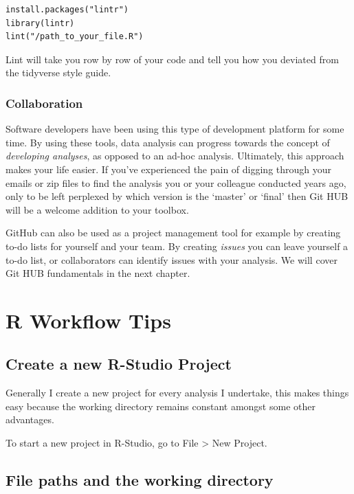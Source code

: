 \documentclass[]{book}
\begin{document}
\begin{verbatim}
install.packages("lintr")
library(lintr)
lint("/path_to_your_file.R")
\end{verbatim}

Lint will take you row by row of your code and tell you how you deviated
from the tidyverse style guide.

\subsection{Collaboration}\label{collaboration}

Software developers have been using this type of development platform
for some time. By using these tools, data analysis can progress towards
the concept of \emph{developing analyses}, as opposed to an ad-hoc
analysis. Ultimately, this approach makes your life easier. If you've
experienced the pain of digging through your emails or zip files to find
the analysis you or your colleague conducted years ago, only to be left
perplexed by which version is the `master' or `final' then Git HUB will
be a welcome addition to your toolbox.

GitHub can also be used as a project management tool for example by
creating to-do lists for yourself and your team. By creating
\emph{issues} you can leave yourself a to-do list, or collaborators can
identify issues with your analysis. We will cover Git HUB fundamentals
in the next chapter.

\chapter{R Workflow Tips}\label{r-workflow-tips}

\section{Create a new R-Studio
Project}\label{create-a-new-r-studio-project}

Generally I create a new project for every analysis I undertake, this
makes things easy because the working directory remains constant amongst
some other advantages.

To start a new project in R-Studio, go to File \textgreater{} New
Project.

\section{File paths and the working
directory}\label{file-paths-and-the-working-directory}
\end{document}
